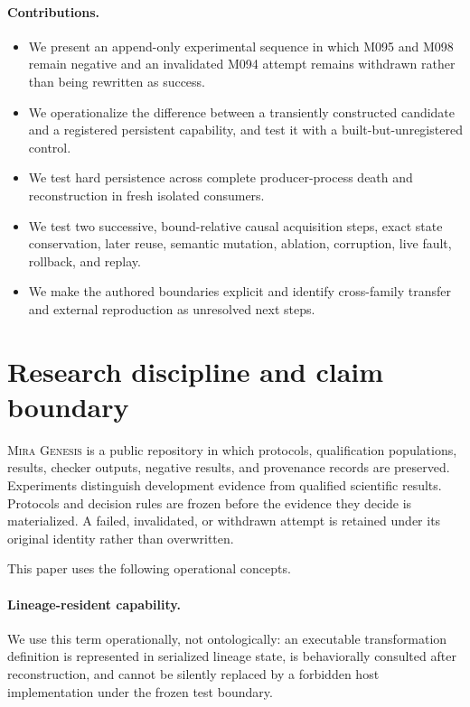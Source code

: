 \documentclass[10pt]{article}
\newcommand{\genesis}{\textsc{Mira Genesis}\xspace}
\begin{document}
\paragraph{Contributions.}
\begin{itemize}
  \item We present an append-only experimental sequence in which M095 and M098 remain negative and an invalidated M094 attempt remains withdrawn rather than being rewritten as success.
  \item We operationalize the difference between a transiently constructed candidate and a registered persistent capability, and test it with a built-but-unregistered control.
  \item We test hard persistence across complete producer-process death and reconstruction in fresh isolated consumers.
  \item We test two successive, bound-relative causal acquisition steps, exact state conservation, later reuse, semantic mutation, ablation, corruption, live fault, rollback, and replay.
  \item We make the authored boundaries explicit and identify cross-family transfer and external reproduction as unresolved next steps.
\end{itemize}

\section{Research discipline and claim boundary}
\genesis is a public repository in which protocols, qualification populations, results, checker outputs, negative results, and provenance records are preserved. Experiments distinguish development evidence from qualified scientific results. Protocols and decision rules are frozen before the evidence they decide is materialized. A failed, invalidated, or withdrawn attempt is retained under its original identity rather than overwritten.

This paper uses the following operational concepts.

\paragraph{Lineage-resident capability.} We use this term operationally, not ontologically: an executable transformation definition is represented in serialized lineage state, is behaviorally consulted after reconstruction, and cannot be silently replaced by a forbidden host implementation under the frozen test boundary.
\end{document}

